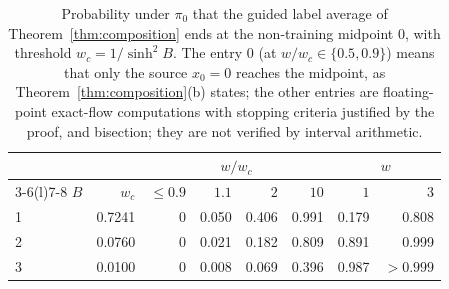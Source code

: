 \documentclass{article} %
\theoremstyle{plain}
\theoremstyle{definition}
\theoremstyle{remark}
\begin{document}
\begin{table}[h]
\centering\small
\begin{tabular}{@{}lrrrrrrr@{}}
\toprule
& & \multicolumn{4}{c}{$w/w_c$} & \multicolumn{2}{c}{$w$}\\
\cmidrule(lr){3-6}\cmidrule(l){7-8}
$B$ & $w_c$ & $\le0.9$ & $1.1$ & $2$ & $10$ & $1$ & $3$\\
\midrule
1 & 0.7241 & 0 & 0.050 & 0.406 & 0.991 & 0.179 & 0.808\\
2 & 0.0760 & 0 & 0.021 & 0.182 & 0.809 & 0.891 & 0.999\\
3 & 0.0100 & 0 & 0.008 & 0.069 & 0.396 & 0.987 & $>0.999$\\
\bottomrule
\end{tabular}
\caption{Probability under $\pi_0$ that the guided label average of
Theorem~\ref{thm:composition} ends at the non-training midpoint $0$, with threshold
$w_c=1/\sinh^2B$. The entry $0$ (at $w/w_c\in\{0.5,0.9\}$) means that only the source $x_0=0$
reaches the midpoint, as Theorem~\ref{thm:composition}(b) states; the other entries are
floating-point exact-flow computations with stopping criteria justified by the proof, and
bisection; they are not verified by interval arithmetic.}
\label{tab:composition}
\end{table}
\end{document}
